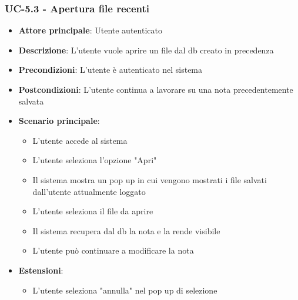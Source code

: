 \documentclass[11pt,a4paper]{article}
\begin{document}
\subsubsection{UC-5.3 - Apertura file recenti}
\begin{itemize}
    \item \textbf{Attore principale}: Utente autenticato
    \item \textbf{Descrizione}: L'utente vuole aprire un file dal db creato in precedenza
    \item \textbf{Precondizioni}: L'utente è autenticato nel sistema
    \item \textbf{Postcondizioni}: L'utente continua a lavorare su una nota precedentemente salvata
    \item \textbf{Scenario principale}:
        \begin{itemize}
            \item L'utente accede al sistema
            \item L'utente seleziona l'opzione "Apri"
            \item Il sistema mostra un pop up in cui vengono mostrati i file salvati dall'utente attualmente loggato
            \item L'utente seleziona il file da aprire
            \item Il sistema recupera dal db la nota e la rende visibile
            \item L'utente può continuare a modificare la nota
        \end{itemize}
    \item \textbf{Estensioni}:
        \begin{itemize}
            \item L'utente seleziona "annulla" nel pop up di selezione
        \end{itemize}
\end{itemize}
\end{document}
